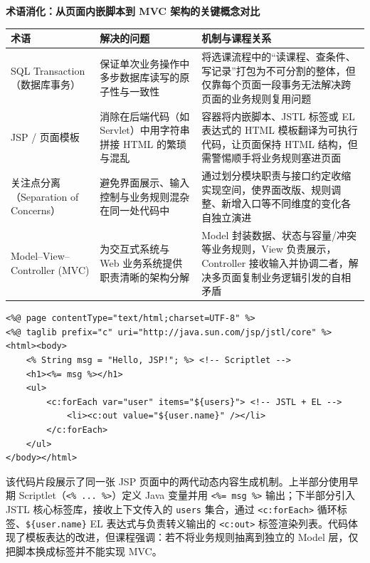 \documentclass[UTF8,a4paper,11pt,fontset=fandol]{ctexart}
\begin{document}
\par{}\textbf{术语消化：从页面内嵌脚本到 MVC 架构的关键概念对比}

\begin{center}\small\begin{tabularx}{\linewidth}{YYY}

\toprule

术语 & 解决的问题 & 机制与课程关系\\\midrule

SQL Transaction（数据库事务） & 保证单次业务操作中多步数据库读写的原子性与一致性 & 将选课流程中的“读课程、查条件、写记录”打包为不可分割的整体，但仅靠每个页面一段事务无法解决跨页面的业务规则复用问题\\[3pt]

JSP / 页面模板 & 消除在后端代码（如 Servlet）中用字符串拼接 HTML 的繁琐与混乱 & 容器将内嵌脚本、JSTL 标签或 EL 表达式的 HTML 模板翻译为可执行代码，让页面保持 HTML 结构，但需警惕顺手将业务规则塞进页面\\[3pt]

关注点分离（Separation of Concerns） & 避免界面展示、输入控制与业务规则混杂在同一处代码中 & 通过划分模块职责与接口约定收缩实现空间，使界面改版、规则调整、新增入口等不同维度的变化各自独立演进\\[3pt]

Model–View–Controller (MVC) & 为交互式系统与 Web 业务系统提供职责清晰的架构分解 & Model 封装数据、状态与容量/冲突等业务规则，View 负责展示，Controller 接收输入并协调二者，解决多页面复制业务逻辑引发的自相矛盾\\[3pt]

\bottomrule\end{tabularx}\end{center}

\begin{lstlisting}[basicstyle={\ttfamily\small\linespread{1}\selectfont},captionpos=t,caption={JSP 页面从 Scriptlet 脚本到 JSTL 标签与 EL 表达式的演进}]
<%@ page contentType="text/html;charset=UTF-8" %>
<%@ taglib prefix="c" uri="http://java.sun.com/jsp/jstl/core" %>
<html><body>
    <% String msg = "Hello, JSP!"; %> <!-- Scriptlet -->
    <h1><%= msg %></h1>
    <ul>
        <c:forEach var="user" items="${users}"> <!-- JSTL + EL -->
            <li><c:out value="${user.name}" /></li>
        </c:forEach>
    </ul>
</body></html>
\end{lstlisting}

该代码片段展示了同一张 JSP 页面中的两代动态内容生成机制。上半部分使用早期 Scriptlet（\texttt{<\% ... \%>}）定义 Java 变量并用 \texttt{<\%= msg \%>} 输出；下半部分引入 JSTL 核心标签库，接收上下文传入的 \texttt{users} 集合，通过 \texttt{<c:forEach>} 循环标签、\texttt{\$\{user.name\}} EL 表达式与负责转义输出的 \texttt{<c:out>} 标签渲染列表。代码体现了模板表达的改进，但课程强调：若不将业务规则抽离到独立的 Model 层，仅把脚本换成标签并不能实现 MVC。
\end{document}

